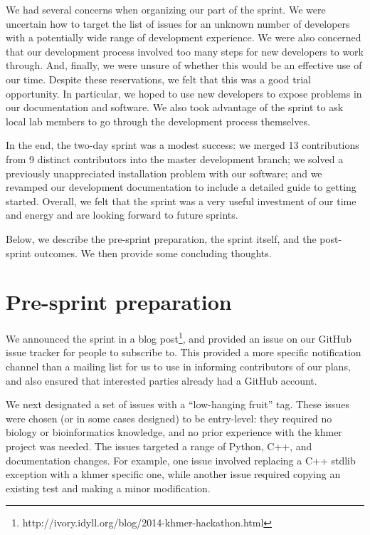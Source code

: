 \documentclass[12pt]{article}
\begin{document}
We had several concerns when organizing our part of the sprint.  We
were uncertain how to target the list of issues for an unknown number
of developers with a potentially wide range of development experience.
We were also concerned that our development process involved too many
steps for new developers to work through.  And, finally, we were
unsure of whether this would be an effective use of our time.  Despite
these reservations, we felt that this was a good trial opportunity.
In particular, we hoped to use new developers to expose problems in
our documentation and software.  We also took advantage of the sprint
to ask local lab members to go through the development process
themselves.

In the end, the two-day sprint was a modest success: we merged 13
contributions from 9 distinct contributors into the master development
branch; we solved a previously unappreciated installation problem with
our software; and we revamped our development documentation to include
a detailed guide to getting started.  Overall, we felt that the sprint
was a very useful investment of our time and energy and are looking
forward to future sprints.

Below, we describe the pre-sprint preparation, the sprint itself, and the
post-sprint outcomes.  We then provide some concluding thoughts.




\section{Pre-sprint preparation}

We announced the sprint in a blog
post\footnote{http://ivory.idyll.org/blog/2014-khmer-hackathon.html},
and provided an issue on our GitHub issue tracker for people to
subscribe to.  This provided a more specific notification channel than
a mailing list for us to use in informing contributors of our plans,
and also ensured that interested parties already had a GitHub account.

We next designated a set of issues with a ``low-hanging fruit'' tag.
These issues were chosen (or in some cases designed) to be
entry-level: they required no biology or bioinformatics knowledge, and
no prior experience with the khmer project was needed.  The issues
targeted a range of Python, C++, and documentation changes.  For
example, one issue involved replacing a C++ stdlib exception with a
khmer specific one, while another issue required copying an existing
test and making a minor modification.
\end{document}
